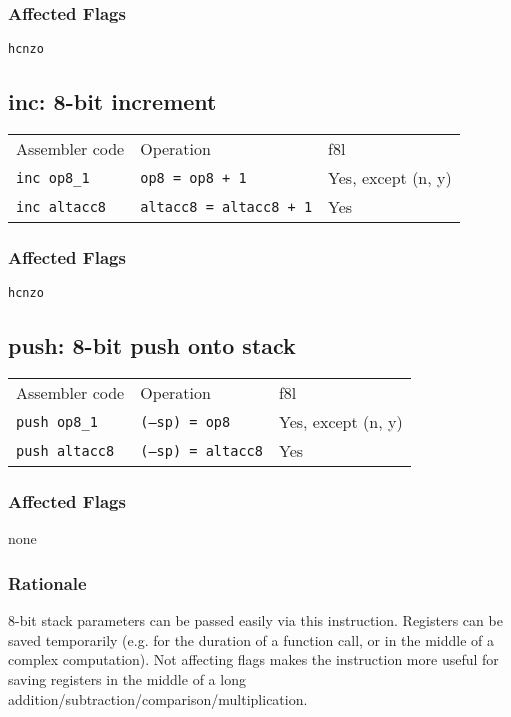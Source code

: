 \documentclass{book}
\begin{document}
\subsubsection*{Affected Flags}

\texttt{hcnzo}


\subsection{inc: 8-bit increment}

\begin{tabular}{l l l}
Assembler code       & Operation                      & f8l \\
\texttt{inc op8\_1}  & \texttt{op8 = op8 + 1}         & Yes, except (n, y) \\
\texttt{inc altacc8} & \texttt{altacc8 = altacc8 + 1} & Yes
\end{tabular}

\subsubsection*{Affected Flags}

\texttt{hcnzo}


\subsection{push: 8-bit push onto stack}

\begin{tabular}{l l l}
Assembler code        & Operation                 & f8l \\
\texttt{push op8\_1}  & \texttt{(--sp) = op8}     & Yes, except (n, y) \\
\texttt{push altacc8} & \texttt{(--sp) = altacc8} & Yes
\end{tabular}

\subsubsection*{Affected Flags}

none

\subsubsection*{Rationale}

8-bit stack parameters can be passed easily via this instruction. Registers can be saved temporarily (e.g. for the duration of a function call, or in the middle of a complex computation). Not affecting flags makes the instruction more useful for saving registers in the middle of a long addition/subtraction/comparison/multiplication.
\end{document}
